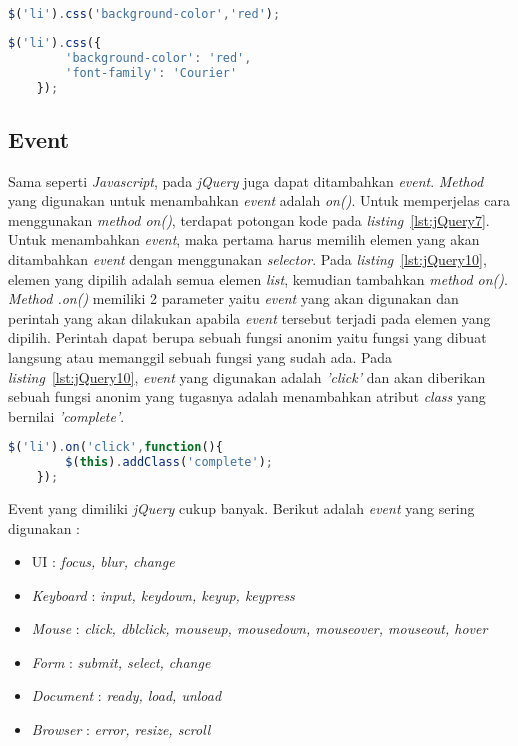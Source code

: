 \begin{lstlisting}[language=Javascript, caption=Mengubah warna background color semua elemen list, label={lst:jQuery8}]
	$('li').css('background-color','red');
\end{lstlisting}

\begin{lstlisting}[language=Javascript, caption=Mengubah warna background color dan jenis font untuk semua elemen list, label={lst:jQuery9}]
	$('li').css({
		'background-color': 'red',
		'font-family': 'Courier'
	});
\end{lstlisting}

\subsection{Event}
Sama seperti \textit{Javascript}, pada \textit{jQuery} juga dapat ditambahkan \textit{event}. \textit{Method} yang digunakan untuk menambahkan \textit{event} adalah \textit{on()}. Untuk memperjelas cara menggunakan \textit{method on()}, terdapat potongan kode pada \textit{listing}~\ref{lst:jQuery7}. Untuk menambahkan \textit{event}, maka pertama harus memilih elemen yang akan ditambahkan \textit{event} dengan menggunakan \textit{selector}. Pada \textit{listing}~\ref{lst:jQuery10}, elemen yang dipilih adalah semua elemen \textit{list}, kemudian tambahkan \textit{method on()}. \textit{Method .on()} memiliki 2 parameter yaitu \textit{event} yang akan digunakan dan perintah yang akan dilakukan apabila \textit{event} tersebut terjadi pada elemen yang dipilih. Perintah dapat berupa sebuah fungsi anonim yaitu fungsi yang dibuat langsung atau memanggil sebuah fungsi yang sudah ada. Pada \textit{listing}~\ref{lst:jQuery10}, \textit{event} yang digunakan adalah \textit{'click'} dan akan diberikan sebuah fungsi anonim yang tugasnya adalah menambahkan atribut \textit{class} yang bernilai \textit{'complete'}. 

\begin{lstlisting}[language=Javascript, caption=Menambahkan atribut \textit{class} pada setiap \textit{list} menggunakan event \textit{'click'}, label={lst:jQuery10}]
	$('li').on('click',function(){
		$(this).addClass('complete');
	});
\end{lstlisting}

Event yang dimiliki \textit{jQuery} cukup banyak. Berikut adalah \textit{event} yang sering digunakan :
\begin{itemize}
	\item UI : \textit{focus, blur, change}
	\item \textit{Keyboard} : \textit{input, keydown, keyup, keypress}
	\item \textit{Mouse} : \textit{click, dblclick, mouseup, mousedown, mouseover, mouseout, hover}
	\item \textit{Form} : \textit{submit, select, change}
	\item \textit{Document} : \textit{ready, load, unload}
	\item \textit{Browser} : \textit{error, resize, scroll}
\end{itemize}

